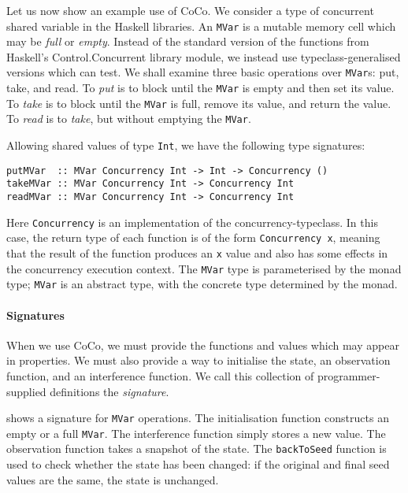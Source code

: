 Let us now show an example use of CoCo.  We consider a type of
concurrent shared variable in the Haskell libraries.  An \verb|MVar|
is a mutable memory cell which may be \emph{full} or \emph{empty}.
Instead of the standard version of the functions from Haskell's
Control.Concurrent library module, we instead use
typeclass-generalised versions which \dejafu{} can test.  We shall
examine three basic operations over \verb|MVar|s: put, take, and read.
To \emph{put} is to block until the \verb|MVar| is empty and then set
its value.  To \emph{take} is to block until the \verb|MVar| is full,
remove its value, and return the value.  To \emph{read} is to
\emph{take}, but without emptying the \verb|MVar|.

Allowing shared values of type \verb|Int|, we have the following type
signatures:

\begin{verbatim}
putMVar  :: MVar Concurrency Int -> Int -> Concurrency ()
takeMVar :: MVar Concurrency Int -> Concurrency Int
readMVar :: MVar Concurrency Int -> Concurrency Int
\end{verbatim}

\noindent
Here \verb|Concurrency| is an implementation of the
concurrency-typeclass.  In this case, the return type of each function
is of the form \verb|Concurrency x|, meaning that the result of the
function produces an \verb|x| value and also has some effects in the
concurrency execution context.  The \verb|MVar| type is parameterised
by the monad type; \verb|MVar| is an abstract type, with the concrete
type determined by the monad.

\paragraph{Signatures}
When we use CoCo, we must provide the functions and values which may
appear in properties.  We must also provide a way to initialise the
state, an observation function, and an interference function.  We call
this collection of programmer-supplied definitions the
\emph{signature}.

 shows a signature for \verb|MVar| operations.  The
initialisation function constructs an empty or a full \verb|MVar|.
The interference function simply stores a new value.  The observation
function takes a snapshot of the state.  The \verb|backToSeed|
function is used to check whether the state has been changed: if the
original and final seed values are the same, the state is unchanged.

